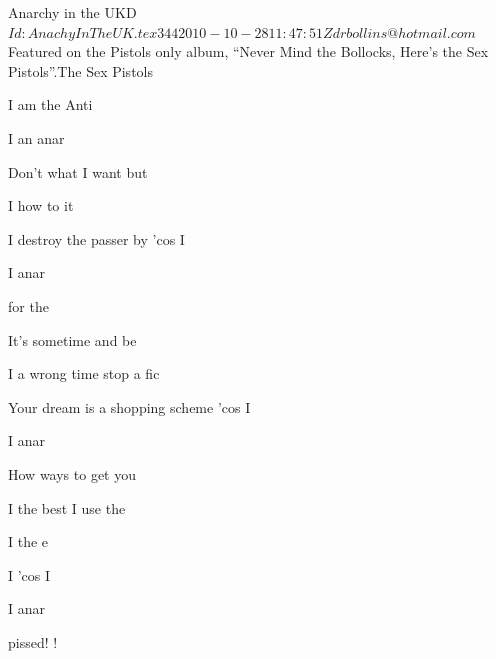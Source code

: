 \begin{SBSong}{Anarchy in the UK}{D}
  {$Id: AnachyInTheUK.tex 344 2010-10-28 11:47:51Z drbollins@hotmail.com $}
  {Featured on the Pistols only album, ``Never Mind the Bollocks, Here's the Sex Pistols''.}{The Sex Pistols}
  \begin{SBVerse}
    I am the Anti

    I  an anar

    Don't  what I want but

    I  how to  it

    I  destroy the passer by 'cos I
  \end{SBVerse}
  \begin{SBChorus}
    I   anar 
  \end{SBChorus}
  \begin{SBVerse}
     for the  

    It's  sometime and  be 

    I  a wrong time stop a  fic 

    Your  dream is a shopping scheme 'cos I
  \end{SBVerse}
  \begin{SBChorus}
    I   anar 
  \end{SBChorus}
  \begin{SBVerse}
    How  ways to get  you 

    I  the best I use the  

    I  the  e

    I    'cos I
  \end{SBVerse}
  \begin{SBChorus}
    I   anar 

     pissed! !
  \end{SBChorus}
\end{SBSong}
